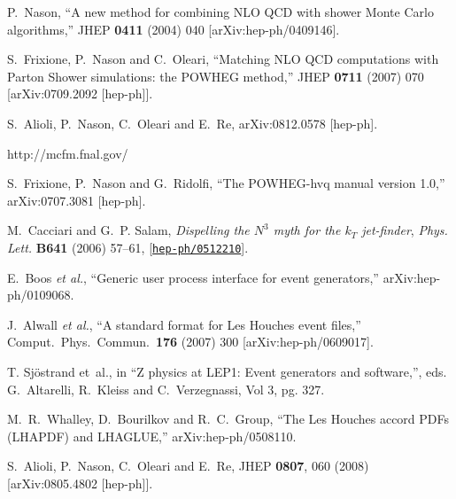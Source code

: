 \documentclass[paper]{JHEP3}
\begin{document}
\begin{thebibliography}{10}

  P.~Nason,
  ``A new method for combining NLO QCD with shower Monte Carlo algorithms,''
  JHEP {\bf 0411} (2004) 040
  [arXiv:hep-ph/0409146].

  S.~Frixione, P.~Nason and C.~Oleari,
``Matching NLO QCD computations with Parton Shower simulations: the POWHEG
method,''
  JHEP {\bf 0711} (2007) 070
  [arXiv:0709.2092 [hep-ph]].


  S.~Alioli, P.~Nason, C.~Oleari and E.~Re,
  arXiv:0812.0578 [hep-ph].

  http://mcfm.fnal.gov/

  S.~Frixione, P.~Nason and G.~Ridolfi,
  ``The POWHEG-hvq manual version 1.0,''
  arXiv:0707.3081 [hep-ph].

M.~Cacciari and G.~P. Salam, {\it {Dispelling the $N^3$ myth for the $k_T$
  jet-finder}},  {\em Phys. Lett.} {\bf B641} (2006) 57--61,
  [\href{http://xxx.lanl.gov/abs/hep-ph/0512210}{{\tt hep-ph/0512210}}].




  E.~Boos {\it et al.},
  ``Generic user process interface for event generators,''
  arXiv:hep-ph/0109068.

  J.~Alwall {\it et al.},
  ``A standard format for Les Houches event files,''
  Comput.\ Phys.\ Commun.\  {\bf 176} (2007) 300
  [arXiv:hep-ph/0609017].


 T. Sj\"ostrand et~al., in
  ``Z physics at LEP1: Event generators and software,'',  eds.
  G.~Altarelli, R.~Kleiss and C.~Verzegnassi, Vol 3, pg. 327.


  M.~R.~Whalley, D.~Bourilkov and R.~C.~Group,
  ``The Les Houches accord PDFs (LHAPDF) and LHAGLUE,''
  arXiv:hep-ph/0508110.


  S.~Alioli, P.~Nason, C.~Oleari and E.~Re,
  JHEP {\bf 0807}, 060 (2008)
  [arXiv:0805.4802 [hep-ph]].



\end{thebibliography}
\end{document}
